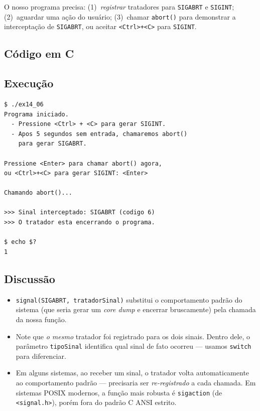 \documentclass[11pt,a4paper]{article}
\begin{document}
O nosso programa precisa: (1)~\emph{registrar} tratadores para \texttt{SIGABRT} e \texttt{SIGINT}; (2)~aguardar uma a\c{c}\~ao do usu\'ario; (3)~chamar \texttt{abort()} para demonstrar a intercepta\c{c}\~ao de \texttt{SIGABRT}, ou aceitar \texttt{<Ctrl>+<C>} para \texttt{SIGINT}.

\subsection*{C\'odigo em C}



\subsection*{Execu\c{c}\~ao}

\begin{saidabox}
\begin{lstlisting}[style=terminal]
$ ./ex14_06
Programa iniciado.
  - Pressione <Ctrl> + <C> para gerar SIGINT.
  - Apos 5 segundos sem entrada, chamaremos abort()
    para gerar SIGABRT.

Pressione <Enter> para chamar abort() agora,
ou <Ctrl>+<C> para gerar SIGINT: <Enter>

Chamando abort()...

>>> Sinal interceptado: SIGABRT (codigo 6)
>>> O tratador esta encerrando o programa.

$ echo $?
1
\end{lstlisting}
\end{saidabox}

\subsection*{Discuss\~ao}

\begin{itemize}[leftmargin=*]
  \item \texttt{signal(SIGABRT, tratadorSinal)} substitui o comportamento padr\~ao do sistema (que seria gerar um \emph{core dump} e encerrar bruscamente) pela chamada da nossa fun\c{c}\~ao.
  \item Note que \emph{o mesmo} tratador foi registrado para os dois sinais. Dentro dele, o par\^ametro \texttt{tipoSinal} identifica qual sinal de fato ocorreu --- usamos \texttt{switch} para diferenciar.
  \item Em alguns sistemas, ao receber um sinal, o tratador volta automaticamente ao comportamento padr\~ao --- precisaria ser \emph{re-registrado} a cada chamada. Em sistemas POSIX modernos, a fun\c{c}\~ao mais robusta \'e \texttt{sigaction} (de \texttt{<signal.h>}), por\'em fora do padr\~ao C ANSI estrito.
\end{itemize}
\end{document}

